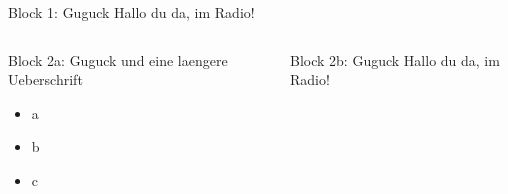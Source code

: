 \documentclass{beamer}
\begin{document}
\begin{frame}

    \begin{block}{Block 1: Guguck}
        Hallo du da, im Radio!
    \end{block}

    \begin{columns}[t, totalwidth=1.02\textwidth]

        \begin{column}{0.45\linewidth}
            \begin{block}{Block 2a: Guguck und eine laengere Ueberschrift}
                \begin{itemize}
                    \item a
                    \item b
                    \item c
                \end{itemize}
            \end{block}
        \end{column}

        \begin{column}{0.45\linewidth}
            \begin{block}{Block 2b: Guguck}
                Hallo du da, im Radio!
            \end{block}
        \end{column}

    \end{columns}

\end{frame}
\end{document}
